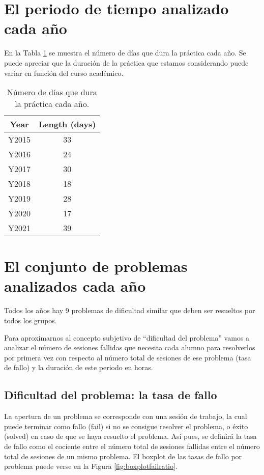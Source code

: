 \section{El periodo de tiempo analizado cada año}

En la Tabla \ref{tab:days} se muestra el número de días que dura la práctica cada año. Se puede apreciar que la duración de la práctica que estamos considerando puede variar en función del curso académico.

\begin{table}[H]
\centering
\caption{Número de días que dura la práctica cada año.}
\label{tab:days}
\begin{tabular}{cc}
\hline
\textbf{Year}  & \textbf{Length (days)}  \\ \hline
Y2015 & 33 \\
Y2016 & 24 \\
Y2017 & 30 \\
Y2018 & 18 \\
Y2019 & 28 \\
Y2020 & 17 \\
Y2021 & 39 \\ \hline
\end{tabular}
\end{table}

\section{El conjunto de problemas analizados cada año}

Todos los años hay 9 problemas de dificultad similar que deben ser resueltos por todos los grupos.

Para aproximarnos al concepto subjetivo de ``dificultad del problema'' vamos a analizar el número de sesiones fallidas que necesita cada alumno para resolverlos por primera vez con respecto al número total de sesiones de ese problema (tasa de fallo) y la duración de este periodo en horas.

\subsection{Dificultad del problema: la tasa de fallo}

La apertura de un problema se corresponde con una sesión de trabajo, la cual puede terminar como fallo (fail) si no se consigue resolver el problema, o éxito (solved) en caso de que se haya resuelto el problema. Así pues, se definirá la tasa de fallo como el cociente entre el número total de sesiones fallidas entre el número total de sesiones de un mismo problema. El boxplot de las tasas de fallo por problema puede verse en la Figura \ref{fig:boxplotfailratio}.

